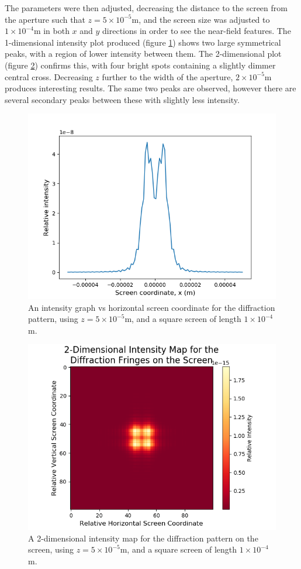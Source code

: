 \documentclass[twocolumn,prl,nobalancelastpage,aps,10pt]{revtex4-1}
\begin{document}
The parameters were then adjusted, decreasing the distance to the screen from the aperture such that $z = 5\times10^{-5}$m, and the screen size was adjusted to $1\times10^{-4}$m in both $x$ and $y$ directions in order to see the near-field features. The 1-dimensional intensity plot produced (figure \ref{1D_smallZ}) shows two large symmetrical peaks, with a region of lower intensity between them. The 2-dimensional plot (figure \ref{2D_smallZ}) confirms this, with four bright spots containing a slightly dimmer central cross. Decreasing $z$ further to the width of the aperture, $2\times10^{-5}$m produces interesting results. The same two peaks are observed, however there are several secondary peaks between these with slightly less intensity. 

\begin{figure}[!ht]
	\includegraphics*[width=0.96\linewidth,clip]{1D_z5e-5}
	\caption{An intensity graph vs horizontal screen coordinate for the diffraction pattern, using $z = 5\times10^{-5}$m, and a square screen of length $1\times10^{-4}$m.} \label{1D_smallZ}
\end{figure}

\begin{figure}
	\includegraphics*[width=0.96\linewidth,clip]{2D_z5e-5}
	\caption{A 2-dimensional intensity map for the diffraction pattern on the screen, using $z = 5\times10^{-5}$m, and a square screen of length $1\times10^{-4}$m.} \label{2D_smallZ}
\end{figure}
\end{document}
